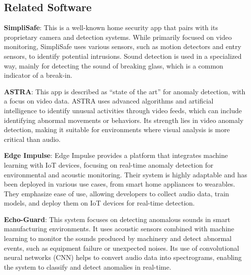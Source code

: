 \documentclass[conference]{IEEEtran}
\begin{document}
\subsection{Related Software}
\textbf{SimpliSafe}: This is a well-known home security app that pairs with its proprietary camera and detection systems. While primarily focused on video monitoring, SimpliSafe uses various sensors, such as motion detectors and entry sensors, to identify potential intrusions. Sound detection is used in a specialized way, mainly for detecting the sound of breaking glass, which is a common indicator of a break-in.

\textbf{ASTRA}: This app is described as “state of the art” for anomaly detection, with a focus on video data. ASTRA uses advanced algorithms and artificial intelligence to identify unusual activities through video feeds, which can include identifying abnormal movements or behaviors. Its strength lies in video anomaly detection, making it suitable for environments where visual analysis is more critical than audio.

\textbf{Edge Impulse}: Edge Impulse provides a platform that integrates machine learning with IoT devices, focusing on real-time anomaly detection for environmental and acoustic monitoring. Their system is highly adaptable and has been deployed in various use cases, from smart home appliances to wearables. They emphasize ease of use, allowing developers to collect audio data, train models, and deploy them on IoT devices for real-time detection.

\textbf{Echo-Guard}: This system focuses on detecting anomalous sounds in smart manufacturing environments. It uses acoustic sensors combined with machine learning to monitor the sounds produced by machinery and detect abnormal events, such as equipment failure or unexpected noises. Its use of convolutional neural networks (CNN) helps to convert audio data into spectrograms, enabling the system to classify and detect anomalies in real-time.
\end{document}
